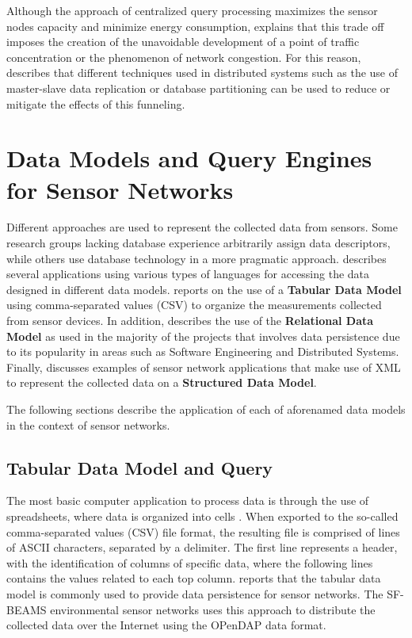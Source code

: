Although the approach of centralized query processing maximizes the sensor
nodes capacity and minimize energy consumption, \cite{sn-storage02} explains
that this trade off imposes the creation of the unavoidable development of a
point of traffic concentration or the phenomenon of network congestion. For
this reason, \cite{sn-storage04} describes that different techniques used in 
distributed systems such as the use of master-slave data replication or 
database partitioning \cite{db-partitioning-relational} can be used to reduce
or mitigate the effects of this funneling.

\section{Data Models and Query Engines for Sensor Networks}
\label{sec:data-models}

Different approaches are used to represent the collected data from sensors.
Some research groups lacking database experience arbitrarily assign data 
descriptors, while others use database technology in a more pragmatic approach.
\cite{sn-programming-language} describes several applications using
various types of languages for accessing the data designed in different data
models. \cite{sn-provenance} reports on the use of a \textbf{Tabular Data Model}
\cite{tabular-model} using comma-separated values (CSV) to organize the
measurements collected from sensor devices. In addition, \cite{sn-db-tinydb} 
describes the use of the \textbf{Relational Data Model} \cite{relational-model} 
as used in the majority of the projects that involves data persistence due to its
popularity in areas such as Software Engineering and Distributed Systems. Finally,
\cite{sn-xml-usage01, sn-xml-usage02} discusses examples of sensor network 
applications that make use of XML \cite{xml} to represent the collected data on a 
\textbf{Structured Data Model}.

The following sections describe the application of each of aforenamed data
models in the context of sensor networks.

\subsection{Tabular Data Model and Query}

The most basic computer application to process data is through the use of
spreadsheets, where data is organized into cells \cite{tabular-model}. When
exported to the so-called comma-separated values (CSV) file format, the
resulting file is comprised of lines of ASCII characters, separated by a
delimiter. The first line represents a header, with the identification of
columns of specific data, where the following lines contains the values
related to each top column. \cite{sn-provenance} reports that the tabular
data model is commonly used to provide data persistence for sensor networks.
The SF-BEAMS environmental sensor networks \cite{sfbeams2006} uses this
approach to distribute the collected data over the Internet using the OPenDAP
\cite{opendap} data format.

